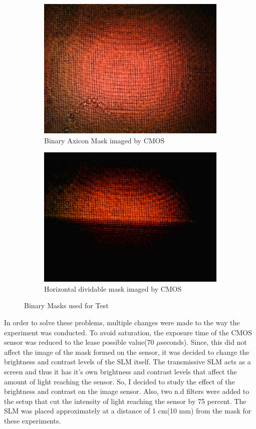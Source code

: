     \begin{figure}[h]
    \centering
    \begin{subfigure}{0.5\textwidth}
    \centering
        \includegraphics[width=0.5\linewidth]{pics/slm/binaryaxiconcmos.jpg}
        \caption{Binary Axicon Mask imaged by CMOS}
        \label{fig:binaryaxiconcmos}
    \end{subfigure}%
    \begin{subfigure}{0.5\textwidth}
    \centering
        \includegraphics[width=0.5\linewidth]{pics/slm/horizontalcmos.jpg}
        \caption{Horizontal dividable mask imaged by CMOS}
        \label{fig:hordivmask}
    \end{subfigure}
    \caption{Binary Masks used for Test}
    \label{fig:InitMaskCMOS}
    \end{figure}
In order to solve these problems, multiple changes were made to the way the experiment was conducted. To avoid saturation, the exposure time of the CMOS sensor was reduced to the lease possible value(70 $\mu$seconds). Since, this did not affect the image of the mask formed on the sensor, it was decided to change the brightness and contrast levels of the SLM itself. The transmissive SLM acts as a screen and thus it has it's own brightness and contrast levels that affect the amount of light reaching the sensor. So, I decided to study the effect of the brightness and contrast on the image sensor. Also, two n.d filters were added to the setup that cut the intensity of light reaching the sensor by 75 percent. The SLM was placed approximately at a distance of 1 cm(10 mm) from the mask for these experiments.
